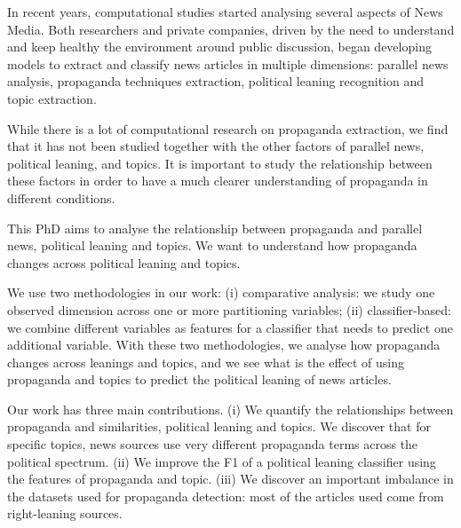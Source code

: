 In recent years, computational studies started analysing several aspects of News Media.
Both researchers and private companies, driven by the need to understand and keep healthy the environment around public discussion, began developing models to extract and classify news articles in multiple dimensions: parallel news analysis, propaganda techniques extraction, political leaning recognition and topic extraction.

While there is a lot of computational research on propaganda extraction, we find that it has not been studied together with the other factors of 
parallel news, political leaning, and topics.
It is important to study the relationship between these factors in order to have a much clearer understanding of propaganda in different conditions.


This PhD aims to analyse the relationship between propaganda and parallel news, political leaning and topics. We want to understand how propaganda changes across political leaning and topics.


We use two methodologies in our work:
(i) comparative analysis: we study one observed dimension across one or more partitioning variables;
(ii) classifier-based: we combine different variables as features for a classifier that needs to predict one additional variable.
With these two methodologies, we analyse how propaganda changes across leanings and topics, and we see what is the effect of using propaganda and topics to predict the political leaning of news articles. 


Our work has three main contributions.
(i) We quantify the relationships between propaganda and similarities, political leaning and topics. We discover that for specific topics, news sources use very different propaganda terms across the political spectrum.
(ii) We improve the F1 of a political leaning classifier using the features of propaganda and topic.
(iii) We discover an important imbalance in the datasets used for propaganda detection: most of the articles used come from right-leaning sources.



